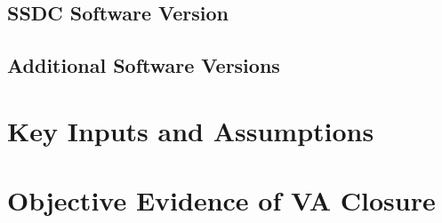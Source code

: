 \documentclass[TR]{spherex}
\begin{document}
\subsection{SSDC Software Version}

\subsection{Additional Software Versions} %

\section{Key Inputs and Assumptions} %


\section{Objective Evidence of VA Closure}

\end{document}

